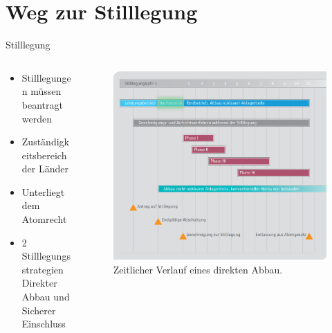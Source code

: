 \section{Weg zur Stilllegung}



\begin{frame}{ Stilllegung }
   \begin{columns}

    \begin{column}{0.48\textwidth}
      \begin{itemize}
       \setlength\itemsep{1.2em}
         \item{ Stilllegungen müssen beantragt werden}
         \item{ Zuständigkeitsbereich der Länder}
         \item{ Unterliegt dem Atomrecht}
         \item{ 2 Stilllegungsstrategien \\ Direkter Abbau und Sicherer Einschluss}
      \end{itemize}
    \end{column}

    \begin{column}{0.48\textwidth}
      \begin{figure}
        \centering
        \includegraphics[width=1.05\textwidth]{./bilder/stilllegung_nachbetrieb.pdf}
        \caption{ Zeitlicher Verlauf eines direkten Abbau\cite{stilllegung_grs}. }
        \label{ fig: stillegung }
      \end{figure}
    \end{column}

  \end{columns}
\end{frame}



